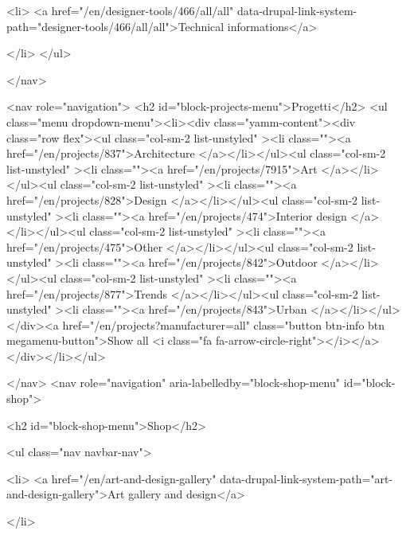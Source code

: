                    
            
      
            
    

                    <li>
                  <a href="/en/designer-tools/466/all/all" data-drupal-link-system-path="designer-tools/466/all/all">Technical informations</a>
                    
            </li>
        </ul>
  

  </nav>

<nav role="navigation">
<h2 id="block-projects-menu">Progetti</h2>
<ul class="menu dropdown-menu"><li><div class="yamm-content"><div class="row flex"><ul class="col-sm-2 list-unstyled" ><li class=""><a href="/en/projects/837">Architecture </a></li></ul><ul class="col-sm-2 list-unstyled" ><li class=""><a href="/en/projects/7915">Art </a></li></ul><ul class="col-sm-2 list-unstyled" ><li class=""><a href="/en/projects/828">Design </a></li></ul><ul class="col-sm-2 list-unstyled" ><li class=""><a href="/en/projects/474">Interior design </a></li></ul><ul class="col-sm-2 list-unstyled" ><li class=""><a href="/en/projects/475">Other </a></li></ul><ul class="col-sm-2 list-unstyled" ><li class=""><a href="/en/projects/842">Outdoor </a></li></ul><ul class="col-sm-2 list-unstyled" ><li class=""><a href="/en/projects/877">Trends </a></li></ul><ul class="col-sm-2 list-unstyled" ><li class=""><a href="/en/projects/843">Urban </a></li></ul></div><a href="/en/projects?manufacturer=all" class="button btn-info btn megamenu-button">Show all <i class="fa fa-arrow-circle-right"></i></a></div></li></ul>

</nav>
<nav role="navigation" aria-labelledby="block-shop-menu" id="block-shop">
      
  <h2 id="block-shop-menu">Shop</h2>
  

        
              <ul class="nav navbar-nav">
            
                   
            
      
            
    

                    <li>
                  <a href="/en/art-and-design-gallery" data-drupal-link-system-path="art-and-design-gallery">Art gallery and design</a>
                    
            </li>
        
                   
            
      
            

